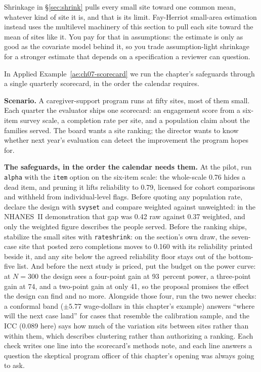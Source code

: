 Shrinkage in \S\ref{sec:shrink} pulls every small site toward one common mean, whatever kind of site it is, and that is its limit. Fay-Herriot small-area estimation \parencite{fay1979estimates,rao2015small} instead uses the multilevel machinery of this section to pull each site toward the mean of sites like it. You pay for that in assumptions: the estimate is only as good as the covariate model behind it, so you trade assumption-light shrinkage for a stronger estimate that depends on a specification a reviewer can question.

In Applied Example~\ref{ae:ch07-scorecard} we run the chapter's safeguards through a single quarterly scorecard, in the order the calendar requires.

\begin{appliedexample}\label{ae:ch07-scorecard}
\textbf{Scenario.} A caregiver-support program runs at fifty sites, most of them small. Each quarter the evaluator ships one scorecard: an engagement score from a six-item survey scale, a completion rate per site, and a population claim about the families served. The board wants a site ranking; the director wants to know whether next year's evaluation can detect the improvement the program hopes for.

\medskip
\textbf{The safeguards, in the order the calendar needs them.} At the pilot, run \texttt{alpha} with the \texttt{item} option on the six-item scale: the whole-scale 0.76 hides a dead item, and pruning it lifts reliability to 0.79, licensed for cohort comparisons and withheld from individual-level flags. Before quoting any population rate, declare the design with \texttt{svyset} and compare weighted against unweighted: in the NHANES~II demonstration that gap was 0.42 raw against 0.37 weighted, and only the weighted figure describes the people served. Before the ranking ships, stabilize the small sites with \texttt{rateshrink}: on the section's own draw, the seven-case site that posted zero completions moves to 0.160 with its reliability printed beside it, and any site below the agreed reliability floor stays out of the bottom-five list. And before the next study is priced, put the budget on the power curve: at $N=300$ the design sees a four-point gain at 93~percent power, a three-point gain at 74, and a two-point gain at only 41, so the proposal promises the effect the design can find and no more. Alongside those four, run the two newer checks: a conformal band ($\pm 5.77$ wage-dollars in this chapter's example) answers \enquote{where will the next case land} for cases that resemble the calibration sample, and the ICC (0.089 here) says how much of the variation sits between sites rather than within them, which describes clustering rather than authorizing a ranking. Each check writes one line into the scorecard's methods note, and each line answers a question the skeptical program officer of this chapter's opening was always going to ask.
\end{appliedexample}

